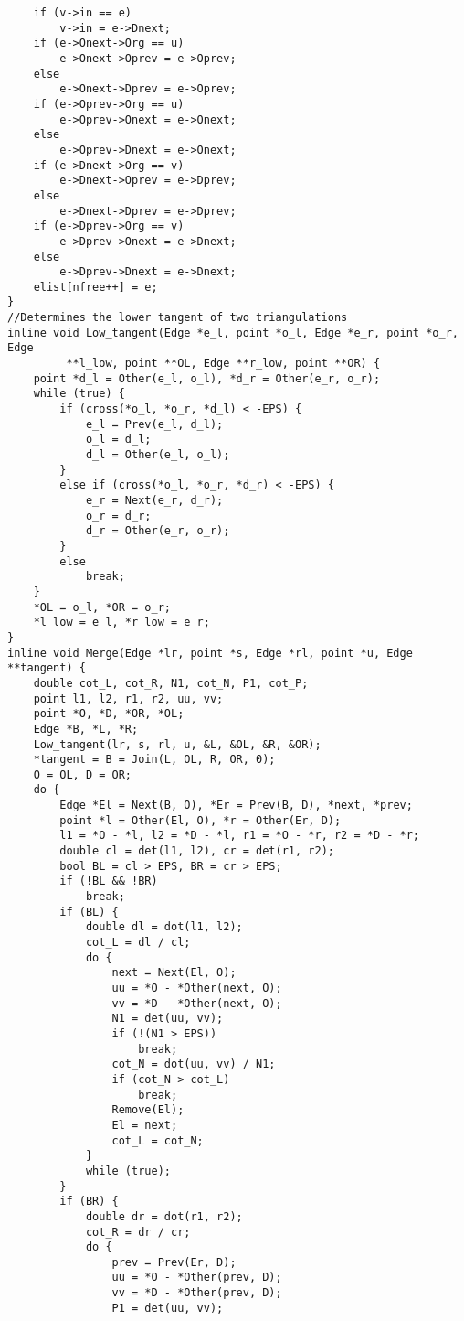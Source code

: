 \documentclass{article}
\begin{document}
\begin{lstlisting}
    if (v->in == e)
        v->in = e->Dnext;
    if (e->Onext->Org == u)
        e->Onext->Oprev = e->Oprev;
    else
        e->Onext->Dprev = e->Oprev;
    if (e->Oprev->Org == u)
        e->Oprev->Onext = e->Onext;
    else
        e->Oprev->Dnext = e->Onext;
    if (e->Dnext->Org == v)
        e->Dnext->Oprev = e->Dprev;
    else
        e->Dnext->Dprev = e->Dprev;
    if (e->Dprev->Org == v)
        e->Dprev->Onext = e->Dnext;
    else
        e->Dprev->Dnext = e->Dnext;
    elist[nfree++] = e;
}
//Determines the lower tangent of two triangulations
inline void Low_tangent(Edge *e_l, point *o_l, Edge *e_r, point *o_r, Edge
         **l_low, point **OL, Edge **r_low, point **OR) {
    point *d_l = Other(e_l, o_l), *d_r = Other(e_r, o_r);
    while (true) {
        if (cross(*o_l, *o_r, *d_l) < -EPS) {
            e_l = Prev(e_l, d_l);
            o_l = d_l;
            d_l = Other(e_l, o_l);
        }
        else if (cross(*o_l, *o_r, *d_r) < -EPS) {
            e_r = Next(e_r, d_r);
            o_r = d_r;
            d_r = Other(e_r, o_r);
        }
        else
            break;
    }
    *OL = o_l, *OR = o_r;
    *l_low = e_l, *r_low = e_r;
}
inline void Merge(Edge *lr, point *s, Edge *rl, point *u, Edge **tangent) {
    double cot_L, cot_R, N1, cot_N, P1, cot_P;
    point l1, l2, r1, r2, uu, vv;
    point *O, *D, *OR, *OL;
    Edge *B, *L, *R;
    Low_tangent(lr, s, rl, u, &L, &OL, &R, &OR);
    *tangent = B = Join(L, OL, R, OR, 0);
    O = OL, D = OR;
    do {
        Edge *El = Next(B, O), *Er = Prev(B, D), *next, *prev;
        point *l = Other(El, O), *r = Other(Er, D);
        l1 = *O - *l, l2 = *D - *l, r1 = *O - *r, r2 = *D - *r;
        double cl = det(l1, l2), cr = det(r1, r2);
        bool BL = cl > EPS, BR = cr > EPS;
        if (!BL && !BR)
            break;
        if (BL) {
            double dl = dot(l1, l2);
            cot_L = dl / cl;
            do {
                next = Next(El, O);
                uu = *O - *Other(next, O);
                vv = *D - *Other(next, O);
                N1 = det(uu, vv);
                if (!(N1 > EPS))
                    break;
                cot_N = dot(uu, vv) / N1;
                if (cot_N > cot_L)
                    break;
                Remove(El);
                El = next;
                cot_L = cot_N;
            }
            while (true);
        }
        if (BR) {
            double dr = dot(r1, r2);
            cot_R = dr / cr;
            do {
                prev = Prev(Er, D);
                uu = *O - *Other(prev, D);
                vv = *D - *Other(prev, D);
                P1 = det(uu, vv);

\end{lstlisting}
\end{document}
